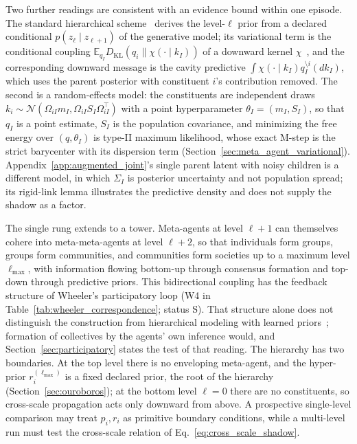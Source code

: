 \documentclass[11pt]{article}
\begin{document}
Two further readings are consistent with an evidence bound within one episode. The standard hierarchical scheme~\cite{friston2008hierarchical, parr2022active} derives the level-$\ell$ prior from a declared conditional $p(z_\ell \mid z_{\ell+1})$ of the generative model; its variational term is the conditional coupling $\mathbb{E}_{q_I} D_{\mathrm{KL}}(q_i \| \chi(\cdot \mid k_I))$ of a downward kernel $\chi$~\cite[Ch.~12]{DennisGaugeVFE2026}, and the corresponding downward message is the cavity predictive $\int \chi(\cdot \mid k_I) q_I^{\setminus i}(dk_I)$, which uses the parent posterior with constituent $i$'s contribution removed. The second is a random-effects model: the constituents are independent draws $k_i \sim \mathcal{N}(\Omega_{iI} m_I, \Omega_{iI} S_I \Omega_{iI}^\top)$ with a point hyperparameter $\theta_I = (m_I, S_I)$, so that $q_I$ is a point estimate, $S_I$ is the population covariance, and minimizing the free energy over $(q, \theta_I)$ is type-II maximum likelihood, whose exact M-step is the strict barycenter with its dispersion term (Section~\ref{sec:meta_agent_variational}). Appendix~\ref{app:augmented_joint}'s single parent latent with noisy children is a different model, in which $\Sigma_I$ is posterior uncertainty and not population spread; its rigid-link lemma illustrates the predictive density and does not supply the shadow as a factor.

The single rung extends to a tower. Meta-agents at level $\ell+1$ can themselves cohere into meta-meta-agents at level $\ell+2$, so that individuals form groups, groups form communities, and communities form societies up to a maximum level $\ell_{\max}$, with information flowing bottom-up through consensus formation and top-down through predictive priors. This bidirectional coupling has the feedback structure of Wheeler's participatory loop (W4 in Table~\ref{tab:wheeler_correspondence}; status S). That structure alone does not distinguish the construction from hierarchical modeling with learned priors~\cite[Ch.~14]{DennisGaugeVFE2026}; formation of collectives by the agents' own inference would, and Section~\ref{sec:participatory} states the test of that reading. The hierarchy has two boundaries. At the top level there is no enveloping meta-agent, and the hyper-prior $r_i^{(\ell_{\max})}$ is a fixed declared prior, the root of the hierarchy (Section~\ref{sec:ouroboros}); at the bottom level $\ell = 0$ there are no constituents, so cross-scale propagation acts only downward from above. A prospective single-level comparison may treat $p_i, r_i$ as primitive boundary conditions, while a multi-level run must test the cross-scale relation of Eq.~\eqref{eq:cross_scale_shadow}.
\end{document}
